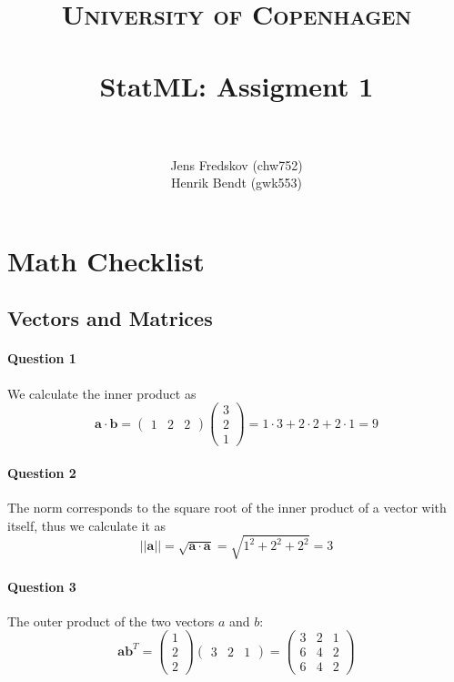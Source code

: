 \documentclass[a4paper, 11pt]{article}
\title{ 
\normalfont \normalsize 
\textsc{University of Copenhagen} \\ [25pt]
\horrule{0.5pt} \\[0.4cm]
\huge StatML: Assigment 1\\
\horrule{2pt} \\[0.5cm]
}
\author{Jens Fredskov (chw752)\\Henrik Bendt (gwk553)}
\newcommand{\vect}[1]{\mathbf{#1}}
\begin{document}
\maketitle

\pagebreak
\section{Math Checklist}
\label{sec:math_checklist}

\subsection{Vectors and Matrices}
\label{sub:vectors_and_matrices}

\paragraph{Question 1}
We calculate the inner product as
\[
    \vect a \cdot \vect b = \begin{pmatrix} 1 & 2 & 2 \end{pmatrix}
                \begin{pmatrix} 3 \\ 2 \\ 1 \end{pmatrix}
              = 1 \cdot 3 + 2 \cdot 2 + 2 \cdot 1
              = 9
\]

\paragraph{Question 2}
The norm corresponds to the square root of the inner product of a vector with itself, thus we calculate it as
\[
    ||\vect a|| = \sqrt{\vect a \cdot \vect a} = \sqrt{1^2 + 2^2 + 2^2} = 3
\]

\paragraph{Question 3}
The outer product of the two vectors $a$ and $b$:
\[
    \vect a \vect b^T =  \begin{pmatrix} 1 \\ 2 \\ 2 \end{pmatrix}
            \begin{pmatrix} 3 & 2 & 1 \end{pmatrix}
         =  \begin{pmatrix} 
                3 & 2 & 1\\
                6 & 4 & 2\\
                6 & 4 & 2
            \end{pmatrix}
\]
\end{document}
